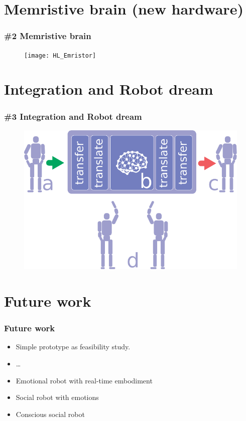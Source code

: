 \documentclass[12pt, aspectratio=169]{beamer}
\begin{document}
\section{Memristive brain (new hardware)}

\begin{frame}
\frametitle{\#2 Memristive brain}
\begin{figure}
\texttt{[image: HL\_Emristor]}
\end{figure}
\end{frame}

\section{Integration and Robot dream}

\begin{frame}
\frametitle{\#3 Integration and Robot dream}
\begin{figure}
\includegraphics[width=0.8\linewidth]{robot-dream}
\end{figure}
\end{frame}

\section{Future work}

\begin{frame}
  \frametitle{Future work}
  
\begin{itemize}
  \item Simple prototype as feasibility study.
  \item \ldots\
  \item Emotional robot with real-time embodiment
  \item Social robot with emotions
  \item Conscious social robot
\end{itemize}

\end{frame}

\end{document}
